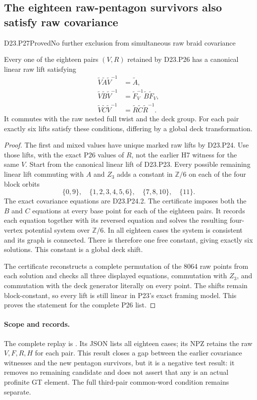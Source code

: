 \subsection{The eighteen raw-pentagon survivors also satisfy raw covariance}

\begin{statement}{D23.P27}{Proved}{No further exclusion from simultaneous raw braid covariance}
\end{statement}
Every one of the eighteen pairs $(V,R)$ retained by
D23.P26 has a canonical linear raw lift satisfying
\[
\begin{split}
 \widetilde V\widetilde A\widetilde V^{-1}&=\widetilde A,\\
 \widetilde V\widetilde B\widetilde V^{-1}
   &=\widetilde F_V^{-1}\widetilde B\widetilde F_V,\\
 \widetilde V\widetilde C\widetilde V^{-1}
   &=\widetilde R\widetilde C\widetilde R^{-1}.
\end{split}
\]
It commutes with the raw nested full twist and the deck
group. For each pair exactly six lifts satisfy these
conditions, differing by a global deck transformation.

\begin{proof}
The first and mixed values have unique marked raw lifts
by D23.P24. Use those lifts, with the exact P26 values
of $R$, not the earlier H7 witness for the same $V$.
Start from the canonical linear lift of D23.P23.
Every possible remaining linear lift commuting with
$A$ and $Z_3$ adds a constant in $\mathbb Z/6$ on each
of the four block orbits
\[
\{0,9\},\quad \{1,2,3,4,5,6\},\quad
\{7,8,10\},\quad \{11\}.
\]
The exact covariance equations are D23.P24.2. The
certificate imposes both the $B$ and $C$ equations
at every base point for each of the eighteen pairs.
It records each equation together with its reversed
equation and solves the resulting four-vertex potential
system over $\mathbb Z/6$. In all eighteen cases the
system is consistent and its graph is connected.
There is therefore one free constant, giving exactly
six solutions. This constant is a global deck shift.

The certificate reconstructs a complete permutation of
the 8064 raw points from each solution and checks all
three displayed equations, commutation with $Z_3$, and
commutation with the deck generator literally on every
point. The shifts remain block-constant, so every lift
is still linear in P23's exact framing model. This
proves the statement for the complete P26 list.
\end{proof}

\paragraph{Scope and records.}
The complete replay is
.
Its JSON lists all eighteen cases; its NPZ retains the
raw $V,F,R,H$ for each pair. This result closes a gap
between the earlier covariance witnesses and the new
pentagon survivors, but it is a negative test result:
it removes no remaining candidate and does not assert
that any is an actual profinite GT element. The full
third-pair common-word condition remains separate.
